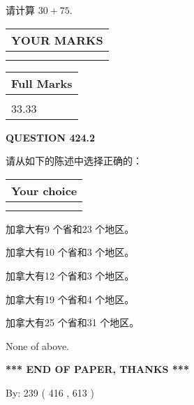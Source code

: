 \documentclass{ctexart}
\begin{document}
  
 
请计算 $ %
30 +  %
75 $.
 

 

 
  
\vspace{0.2in}
  
\noindent\begin{tabular}{|l|}
\hline
 YOUR MARKS  \\
\hline
 \\ 
 \\ 
\hline
\end{tabular}
\hspace{0.05in} \begin{tabular}{|l|}
\hline
 Full Marks  \\
\hline
 \\ 
33.33 \\
\hline
\end{tabular}
{\textbf{\Large{QUESTION
424.2 
}}}
  
  
请从如下的陈述中选择正确的：
  
  
\noindent\hspace{3.0in} \begin{tabular}{|l|}
\hline
Your choice \\
\hline
 \\ 
 \\ 
\hline
\end{tabular}
  
  
 
 
加拿大有9 个省和23 个地区。
 
 
加拿大有10 个省和3 个地区。
 
 
加拿大有12 个省和3 个地区。
 
 
加拿大有19 个省和4 个地区。
 
 
加拿大有25 个省和31 个地区。
 
 
 None of above.
 
 
   
   
 \vspace{0.2in}
 
   
   
   
   
\vspace{1.0in} 
{\textbf{\large{ *** END OF PAPER, THANKS *** }}} 
   
   
\hspace{1.0in} By: 
 239 ( 416 ,  613 )
   
\end{document}
